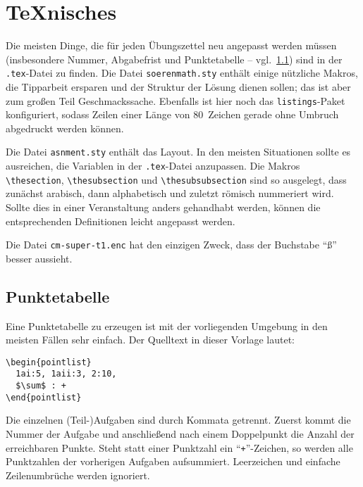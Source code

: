 \documentclass[parskip=half-,DIV14,10pt]{scrartcl}
\begin{document}
\appendix

\section{\TeX{}nisches}

Die meisten Dinge, die für jeden Übungszettel neu angepasst werden
müssen (insbesondere Nummer, Abgabefrist und Punktetabelle --
vgl.\ \ref{sec:tabelle}) sind in der \lstinline!.tex!-Datei zu
finden.  Die Datei \lstinline!soerenmath.sty! enthält einige nützliche
Makros, die Tipparbeit ersparen und der Struktur der Lösung dienen
sollen; das ist aber zum großen Teil Geschmackssache.  Ebenfalls ist
hier noch das \lstinline!listings!-Paket konfiguriert, sodass Zeilen
einer Länge von 80~Zeichen gerade ohne Umbruch abgedruckt werden
können.

Die Datei \lstinline!asnment.sty! enthält das Layout.  In den meisten
Situationen sollte es ausreichen, die Variablen in der
\lstinline!.tex!-Datei anzupassen.  Die Makros
\lstinline!\thesection!, \lstinline!\thesubsection! und
\lstinline!\thesubsubsection! sind so ausgelegt, dass zunächst
arabisch, dann alphabetisch und zuletzt römisch nummeriert wird.
Sollte dies in einer Veranstaltung anders gehandhabt werden, können
die entsprechenden Definitionen leicht angepasst werden.

Die Datei \lstinline!cm-super-t1.enc! hat den einzigen Zweck, dass der
Buchstabe "`ß"' besser aussieht.

\subsection{Punktetabelle}
\label{sec:tabelle}

Eine Punktetabelle zu erzeugen ist mit der vorliegenden Umgebung in
den meisten Fällen sehr einfach.  Der Quelltext in dieser Vorlage
lautet:
\begin{lstlisting}
\begin{pointlist}
  1ai:5, 1aii:3, 2:10,
  $\sum$ : +
\end{pointlist}
\end{lstlisting}

Die einzelnen (Teil-)Aufgaben sind durch Kommata getrennt.  Zuerst
kommt die Nummer der Aufgabe und anschließend nach einem Doppelpunkt
die Anzahl der erreichbaren Punkte.  Steht statt einer Punktzahl ein
"`\lstinline!+!"'-Zeichen, so werden alle Punktzahlen der vorherigen
Aufgaben aufsummiert.  Leerzeichen und einfache Zeilenumbrüche werden
ignoriert.
\end{document}
